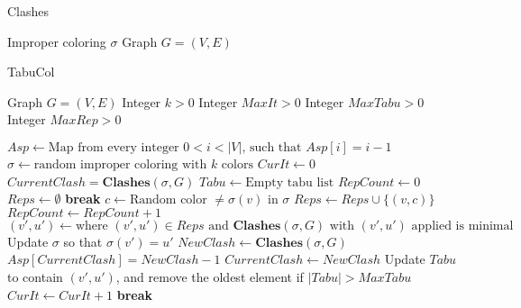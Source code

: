 \documentclass{amsart}
\newcommand{\algorithmicbreak}{\textbf{break}}
\newcommand{\BREAK}{\STATE \algorithmicbreak}
\begin{document}
\begin{algorithm}[H]
    \caption{Clashes}
    \begin{algorithmic}[1]
        \REQUIRE Improper coloring $\sigma$
        \REQUIRE Graph $G = (V,E)$
    \end{algorithmic}
\end{algorithm}

\begin{algorithm}[H]
    \caption{TabuCol}
    \begin{algorithmic}[1]
        \REQUIRE Graph $G = (V,E)$
        \REQUIRE Integer $k > 0$
        \REQUIRE Integer $MaxIt > 0$
        \REQUIRE Integer $MaxTabu > 0$
        \REQUIRE Integer $MaxRep > 0$
      
        \STATE $Asp \leftarrow \text{Map from every integer $0 < i < |V|$, such that $Asp[i] = i-1$}$
        \STATE $\sigma \leftarrow \text{random improper coloring with $k$ colors}$
        \STATE $CurIt \leftarrow 0$
        \STATE $CurrentClash = \textbf{Clashes}(\sigma,G)$
        \STATE $Tabu \leftarrow \text{Empty tabu list}$
            \STATE $RepCount \leftarrow 0$
            \STATE $Reps \leftarrow \emptyset$
                    \BREAK
                \ENDIF
                \STATE $c \leftarrow \text{Random color $\neq \sigma(v)$ in $\sigma$}$
                    \STATE $Reps \leftarrow Reps \cup \{(v,c)\}$
                \ENDIF
                \STATE $RepCount \leftarrow RepCount + 1$
            \ENDFOR
            \STATE $(v',u') \leftarrow \text{where $(v',u') \in Reps$ and
            $\textbf{Clashes}(\sigma,G)$ with $(v',u')$ applied is minimal }$
            \STATE Update $\sigma$ so that $\sigma(v') = u'$
            \STATE $NewClash \leftarrow \textbf{Clashes}(\sigma,G)$
                \STATE $Asp[CurrentClash] = NewClash-1$
            \ENDIF
            \STATE $CurrentClash \leftarrow NewClash$
            \STATE Update $Tabu$ to contain $(v',u')$, and remove the oldest element if $|Tabu| > MaxTabu$
            \STATE $CurIt \leftarrow CurIt + 1$
                \BREAK
            \ENDIF
        \ENDWHILE
    \end{algorithmic}
\end{algorithm}
\end{document}
